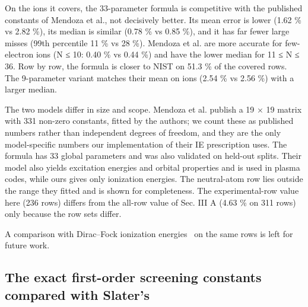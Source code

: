 \documentclass[aps,pra,preprint,superscriptaddress,amsmath,amssymb]{revtex4-2}
\begin{document}
On the ions it covers, the 33-parameter formula is competitive with the published constants of Mendoza et al., not decisively better. Its mean error is lower (1.62 \% vs 2.82 \%), its median is similar (0.78 \% vs 0.85 \%), and it has far fewer large misses (99th percentile 11 \% vs 28 \%). Mendoza et al. are more accurate for few-electron ions (N ≤ 10: 0.40 \% vs 0.44 \%) and have the lower median for 11 ≤ N ≤ 36. Row by row, the formula is closer to NIST on 51.3 \% of the covered rows. The 9-parameter variant matches their mean on ions (2.54 \% vs 2.56 \%) with a larger median.


The two models differ in size and scope. Mendoza et al. publish a 19 × 19 matrix with 331 non-zero constants, fitted by the authors; we count these as published numbers rather than independent degrees of freedom, and they are the only model-specific numbers our implementation of their IE prescription uses. The formula has 33 global parameters and was also validated on held-out splits. Their model also yields excitation energies and orbital properties and is used in plasma codes, while ours gives only ionization energies. The neutral-atom row lies outside the range they fitted and is shown for completeness. The experimental-row value here (236 rows) differs from the all-row value of Sec. III A (4.63 \% on 311 rows) only because the row sets differ.


A comparison with Dirac–Fock ionization energies~\cite{r30} on the same rows is left for future work.


\subsection{The exact first-order screening constants compared with Slater's}
\end{document}
